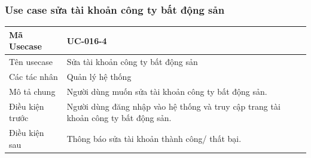 \documentclass[12pt,a4paper]{article}
\begin{document}
    \subsubsection*{Use case sửa tài khoản công ty bất động sản }
    \begin{table}[H]
        \centering
        \begin{tabular}{|p{3.5cm}|p{11.5cm}|c|}
            \hline
            Mã Usecase      & UC-016-4                                                                            \\
            \hline
            Tên usecase     & Sửa tài khoản công ty bất động sản                                                  \\
            \hline
            Các tác nhân    & Quản lý hệ thống                                                                    \\
            \hline
            Mô tả chung     & Người dùng muốn sửa tài khoản công ty bất động sản.                                 \\
            \hline

            Điều kiện trước & Người dùng đăng nhập vào hệ thống và truy cập trang tài khoản công ty bất động sản. \\
            \hline

            Điều kiện sau   & Thông báo sửa tài khoản thành công/ thất bại.                                       \\
            \hline


\end{tabular}
\end{table}
\end{document}
